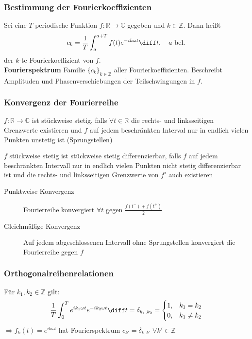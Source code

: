 \begin{sectionbox}
    \subsubsection{Bestimmung der Fourierkoeffizienten}
    Sei eine $T$-periodische Funktion $f: \mathbb R \rightarrow \mathbb C$ gegeben und $k\in\mathbb Z$. Dann heißt
    \begin{equation*}
        c_k=\frac{1}{T}\int_a^{a+T} f(t)e^{-ik\omega t}\diff t, \quad a \text{ bel.}
    \end{equation*}
    der $k$-te Fourierkoeffizient von $f$. \\
    \textbf{Fourierspektrum} Familie $\{c_k\}_{k\in\mathbb Z}$ aller Fourierkoeffizienten. Beschreibt Amplituden und Phasenverschiebungen der Teilschwingungen in $f$.

    \subsubsection{Konvergenz der Fourierreihe}
    \begin{sectionbox}
        $f:\mathbb R \rightarrow \mathbb C$ ist stückweise stetig, falls $\forall t \in \mathbb R$ die rechts- und linksseitigen Grenzwerte existieren und $f$ auf jedem beschränkten Interval nur in endlich vielen Punkten unstetig ist (Sprungstellen)
    \end{sectionbox}

    \begin{sectionbox}
        $f$ stückweise stetig ist stückweise stetig differenzierbar, falls $f$ auf jedem beschränkten Intervall nur in endlich vielen Punkten nicht stetig differenzierbar ist und die rechts- und linksseitigen Grenzwerte von $f'$ auch existieren
    \end{sectionbox}

    \begin{description}
        \item[Punktweise Konvergenz] Fourierreihe konvergiert $\forall t$ gegen $\frac{f(t^-) + f(t^+)}{2}$
        \item[Gleichmäßige Konvergenz] Auf jedem abgeschlossenen Intervall ohne Sprungstellen konvergiert die Fourierreihe gegen $f$
    \end{description}
\end{sectionbox}

\begin{sectionbox}
    \subsubsection{Orthogonalreihenrelationen}
    Für $k_1, k_2 \in \mathbb Z$ gilt:
    \begin{equation*}
        \frac{1}{T}\int_0^Te^{ik_1\omega t}e^{-ik_2\omega t}\diff t = \delta_{k_1,k_2}=\begin{cases}
            1, & k_1=k_2    \\
            0, & k_1\ne k_2
        \end{cases}
    \end{equation*}
    $\Rightarrow f_k(t)=e^{ik\omega t}$ hat Fourierspektrum $c_{k'}=\delta_{k,k'} \; \forall k' \in \mathbb Z$
\end{sectionbox}